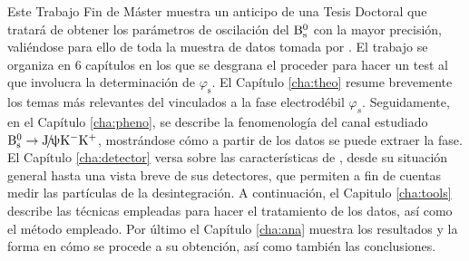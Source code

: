 Este Trabajo Fin de Máster muestra un anticipo de una Tesis Doctoral que tratará de obtener los parámetros de oscilación del $\text{B}{}_{\text{s}}^{0}$ con la mayor precisión, valiéndose para ello de toda la muestra de datos tomada por \lhcb.
El trabajo se organiza en 6 capítulos en los que se desgrana el proceder para hacer un test al \stdmod que involucra la determinación de $\varphi_{\text{s}}$. 
El Capítulo \ref{cha:theo} resume brevemente los temas más relevantes del \stdmod vinculados a la fase electrodébil $\varphi_s$. 
Seguidamente, en el Capítulo \ref{cha:pheno}, se describe la fenomenología del canal estudiado $\text{B}{}_{\text{s}}^{0} \rightarrow \text{J}\!/\!\uppsi \text{K}{}^{-} \text{K}{}^{+}$, mostrándose cómo a partir de los datos se puede extraer la fase.
El Capítulo \ref{cha:detector} versa sobre las características de \lhcb, desde su situación general hasta una vista breve de sus detectores, que permiten a fin de cuentas medir las partículas de la desintegración.
A continuación, el Capitulo \ref{cha:tools} describe las técnicas empleadas para hacer el tratamiento de los datos, así como el método empleado.
Por último el Capítulo \ref{cha:ana} muestra los resultados y la forma en cómo se procede a su obtención, así como también las conclusiones. 
%


